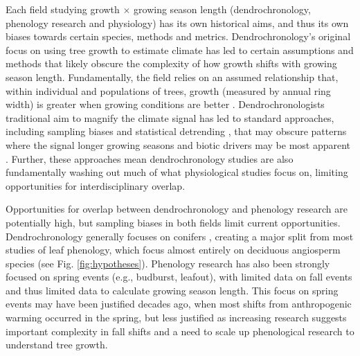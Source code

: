 \documentclass[11pt]{article}
\begin{document}
Each field studying growth $\times$ growing season length (dendrochronology, phenology research and physiology) has its own historical aims, and thus its own biases towards certain species, methods and metrics. Dendrochronology's original focus on using tree growth to estimate climate has led to certain assumptions and methods  that likely obscure the complexity of how growth shifts with growing season length. Fundamentally, the field relies on an assumed relationship that, within individual and populations of trees, growth (measured by annual ring width) is greater when growing conditions are better \citep[e.g.,]{cook2013methods}.  Dendrochronologists traditional aim to magnify the climate signal has led to standard approaches, including sampling biases \citep[e.g., to `climate-sensitive' individual trees,][]{klesse2018sampling,nehrbass2014influence} and statistical detrending \citep{rollinson2021climate}, that may obscure patterns where the signal longer growing seasons and biotic drivers may be most apparent \citep[such as rapid growth phases,][]{manzanedo2019towards}.  %
Further, these approaches mean dendrochronology studies are also fundamentally washing out much of what physiological studies focus on, limiting opportunities for interdisciplinary overlap. %

Opportunities for overlap between dendrochronology and phenology research are potentially high, but sampling biases in both fields limit current opportunities. Dendrochronology generally focuses on conifers \citep[gymnosperms][]{zhao2019international}, creating a major split from most studies of leaf phenology, which focus almost entirely on deciduous angiosperm species (see Fig. \ref{fig:hypotheses}). Phenology research has also been strongly focused on spring events (e.g., budburst, leafout), with limited data on fall events and thus limited data to calculate growing season length. This focus on spring events may have been justified decades ago, when most shifts from anthropogenic warming occurred in the spring, but less justified as increasing research suggests important complexity in fall shifts \citep{gill2015,zohner2023effect} and a need to scale up phenological research to understand tree growth.
\end{document}

